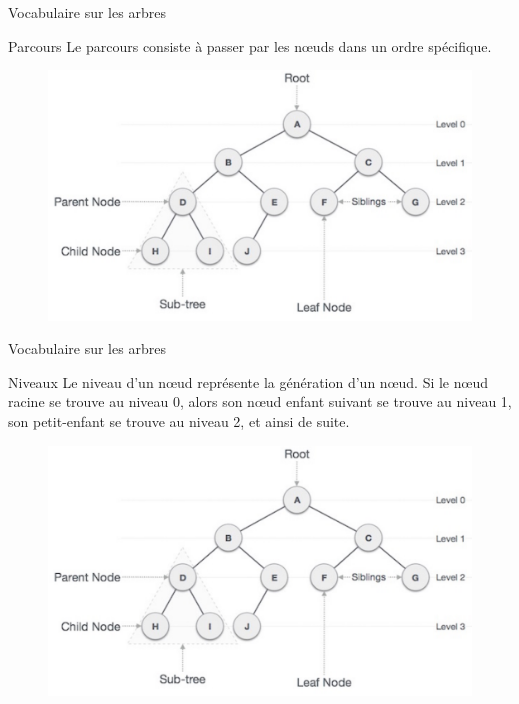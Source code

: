 \documentclass[10pt,xcolor=dvipsnames]{beamer}
\newcommand{\defin}[1]{\textcolor{darkspringgreen}{#1}}
\begin{document}
\begin{frame}{Vocabulaire sur les arbres}
        \begin{exampleblock}{Parcours}
    Le \defin{parcours} consiste à passer par les nœuds dans un ordre spécifique.
    \end{exampleblock}
    
    \begin{figure}
    \centering
    \includegraphics[scale=0.2]{figures/CM2/ABR-1.png}
    \label{fig:my_label}
\end{figure}
\end{frame}

\begin{frame}{Vocabulaire sur les arbres}
        \begin{exampleblock}{Niveaux}
    Le \defin{niveau} d'un nœud représente la génération d'un nœud. Si le nœud racine se trouve au niveau 0, alors son nœud enfant suivant se trouve au niveau 1, son petit-enfant se trouve au niveau 2, et ainsi de suite.
    \end{exampleblock}
    
    \begin{figure}
    \centering
    \includegraphics[scale=0.2]{figures/CM2/ABR-1.png}
    \label{fig:my_label}
\end{figure}
\end{frame}
\end{document}
